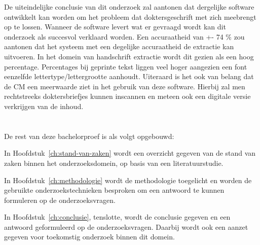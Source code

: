 De uiteindelijke conclusie van dit onderzoek zal aantonen dat dergelijke software ontwikkelt kan worden om het probleem dat doktersgeschrift met zich meebrengt op te lossen. Wanneer de software levert wat er gevraagd wordt kan dit onderzoek als succesvol verklaard worden. Een accuraatheid van +- 74 \% zou aantonen dat het systeem met een degelijke accuraatheid de extractie kan uitvoeren. In het domein van handschrift extractie wordt dit gezien als een hoog percentage. Percentages bij geprinte tekst liggen veel hoger aangezien een font eenzelfde lettertype/lettergrootte aanhoudt. Uiteraard is het ook van belang dat de CM een meerwaarde ziet in het gebruik van deze software. Hierbij zal men rechtstreeks doktersbriefjes kunnen inscannen en meteen ook een digitale versie verkrijgen van de inhoud.  

\section{}
\label{sec:opzet-bachelorproef}


De rest van deze bachelorproef is als volgt opgebouwd:

In Hoofdstuk~\ref{ch:stand-van-zaken} wordt een overzicht gegeven van de stand van zaken binnen het onderzoeksdomein, op basis van een literatuurstudie.

In Hoofdstuk~\ref{ch:methodologie} wordt de methodologie toegelicht en worden de gebruikte onderzoekstechnieken besproken om een antwoord te kunnen formuleren op de onderzoeksvragen.


In Hoofdstuk~\ref{ch:conclusie}, tenslotte, wordt de conclusie gegeven en een antwoord geformuleerd op de onderzoeksvragen. Daarbij wordt ook een aanzet gegeven voor toekomstig onderzoek binnen dit domein.